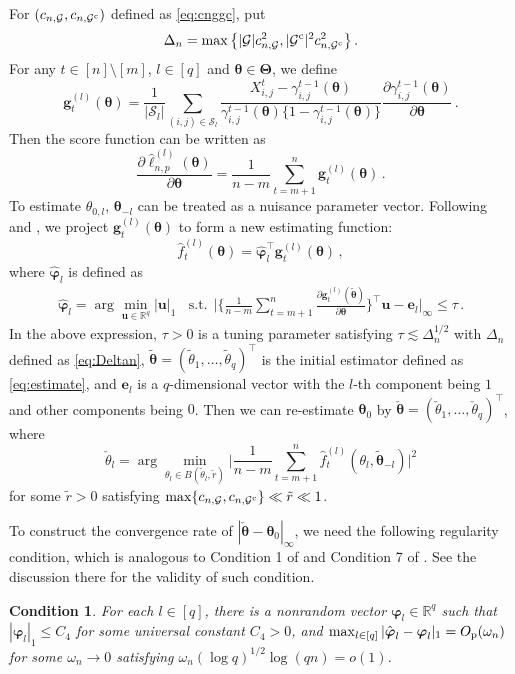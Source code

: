 \documentclass[12pt]{article}
\newtheorem{condition}{Condition}
\newcommand{\bTheta}{\boldsymbol \Theta}
\newcommand{\btheta}{\boldsymbol \theta}
\newcommand{\bvarphi}{\boldsymbol \varphi}
\def\T{{\scriptscriptstyle \top} }
\newcommand{\be}{{\mathbf e}}
\newcommand{\bu}{{\mathbf u}}
\newcommand{\bg}{{\mathbf g}}
\newcommand{\btc}{{\rm c}}
\newcommand{\0}{{\bf 0}}
\begin{document}
For $(c_{n,\mathcal{G}},c_{n,\mathcal{G}^{\btc}})$ defined as \eqref{eq:cnggc}, put
\begin{align}\label{eq:Deltan}
\Delta_n=\max\big\{|\mathcal{G}|c_{n,\mathcal{G}}^2,|\mathcal{G}^{\btc}|^2c_{n,\mathcal{G}^{\btc}}^2\big\}\,.
\end{align}
For any $t\in[n]\setminus[m]$, $l\in[q]$ and $\btheta\in\bTheta$, we define
\[
\bg_t^{(l)}(\btheta)=\frac{1}{|\mathcal{S}_l|}\sum_{(i,j)\in\mathcal{S}_l}\frac{X_{i,j}^t-\gamma_{i,j}^{t-1}(\btheta)}{\gamma_{i,j}^{t-1}(\btheta)\{1-\gamma_{i,j}^{t-1}(\btheta)\}}\frac{\partial\gamma_{i,j}^{t-1}(\btheta)}{\partial\btheta}\,.
\]
Then the score function can be written as
\[
\frac{\partial\hat{\ell}_{n,p}^{(l)}(\btheta)}{\partial\btheta}=\frac{1}{n-m}\sum_{t=m+1}^n\bg^{(l)}_t(\btheta)\,.
\]
To estimate $\theta_{0,l}$, $\btheta_{-l}$ %
can be treated as a nuisance parameter vector. Following  \cite{ChangChenTangWu2021} and \cite{ChangShiZhang2023}, %
we  project $\bg_t^{(l)}(\btheta)$ to form a new estimating function:
\[
\hat{f}_t^{(l)}(\btheta)=\hat{\bvarphi}_{l}^{\T}\bg_t^{(l)}(\btheta)\,,
\]
where $\hat{\bvarphi}_{l}$ is defined as
\begin{align}\label{eq:hatanl}
\hat{\bvarphi}_{l}=\arg\min_{\bu\in\mathbb{R}^q}|\bu|_1~~~~\textrm{s.t.}~~\bigg|\bigg\{\frac{1}{n-m}\sum_{t=m+1}^n\frac{\partial\bg_t^{(l)}(\tilde{\btheta})}{\partial\btheta}\bigg\}^{\T}\bu-\be_l\bigg|_\infty\leq\tau\,.
\end{align}
In the above expression, $\tau>0$ is a tuning parameter satisfying $\tau\lesssim \Delta_n^{1/2}$ with $\Delta_n$ defined as \eqref{eq:Deltan}, $\tilde{\btheta}=(\tilde{\theta}_1,\ldots,\tilde{\theta}_q)^{\T}$ is the initial estimator defined as \eqref{eq:estimate}, and $\be_l$ is a $q$-dimensional vector with the $l$-th component being $1$ and other components being $0$. Then we can re-estimate $\btheta_0$ by $\check{\btheta}=(\check{\theta}_1,\ldots,\check{\theta}_q)^{\T}$, where 
\begin{equation} \label{eq:theta_check}
    \check{\theta}_l=\arg\min_{\theta_l\in B(\tilde{\theta}_l, \tilde r)}\bigg|\frac{1}{n-m}\sum_{t=m+1}^n\hat{f}_t^{(l)}(\theta_l,\tilde{\btheta}_{-l})\bigg|^2
\end{equation}
for some $\tilde{r}>0$ satisfying $\max\{c_{n,\mathcal{G}},c_{n,\mathcal{G}^{\btc}}\}\ll \tilde{r}\ll 1$. 

To construct the convergence rate of $|\check{\btheta}-\btheta_{0}|_\infty$, we need the following regularity condition, which is analogous to Condition 1 of \cite{ChangChenTangWu2021} and Condition 7 of \cite{ChangShiZhang2023}. See the discussion there for the validity of such condition.
\begin{condition}\label{as:al}
  For each $l\in[q]$, there is a nonrandom vector $\bvarphi_l\in\mathbb{R}^q$ 
  such that $|\bvarphi_l|_1\leq C_4$ for some universal constant $C_4>0$, and $\max_{l\in[q]}|\hat{\bvarphi}_l-\bvarphi_l|_1=O_{\rm p}(\omega_n)$ for some $\omega_n\rightarrow0$ satisfying $\omega_n(\log q)^{1/2}\log(qn)=o(1)$.   
\end{condition}
\end{document}

